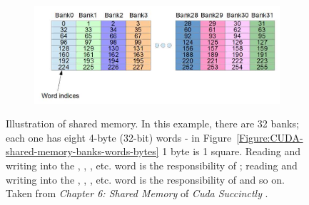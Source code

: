 \begin{figure}[h!]
	\begin{subfigure}{\textwidth}
		\centering
		\hspace*{-0.8cm}
		\includegraphics[width=13cm, keepaspectratio]{images/ch1/CUDA_shared_memory_banks_words_indices.png}
		\label{Figure:CUDA-shared-memory-banks-words-ids}
	\end{subfigure}
	\caption{Illustration of shared memory. In this example, there are 32 banks; each one has eight 4-byte (32-bit) words - in Figure~\ref{Figure:CUDA-shared-memory-banks-words-bytes} 1 byte is 1 square. Reading and writing into the , , , etc. word is the responsibility of ; reading and writing into the , , , etc. word is the responsibility of  and so on. Taken from \emph{Chapter 6: Shared Memory} of \emph{Cuda Succinctly} \cite{Rose2017}.}
	\label{Figure:CUDA-shared-memory-banks-words}
\end{figure}

